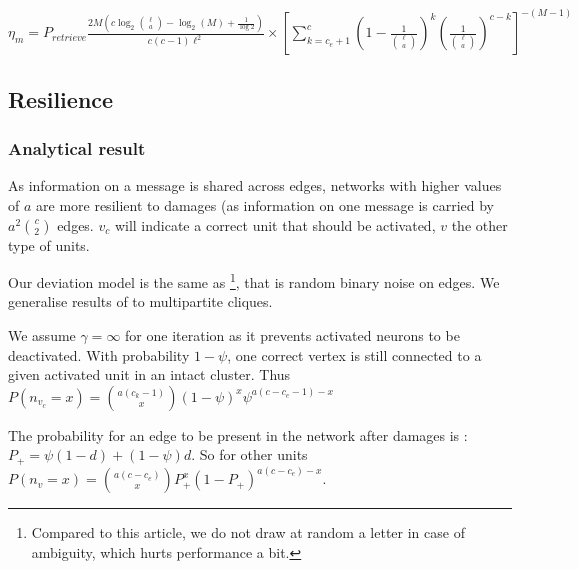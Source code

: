 \documentclass[english,10pt,twocolumn]{IEEEtran}
\renewcommand{\ge}{\geqslant}
\theoremstyle{definition}
\begin{document}
		$\eta_m = P_{retrieve}  \frac{2 M\left(c \log_2{\ell \choose a } - \log_2(M) + \frac{1}{\log 2} \right)}{c(c-1)\ell^2} \times \left [\sum_{k = c_e+1}^{c} \left (1-\frac{1}{{\ell \choose a}} \right )^k \left (\frac{1}{{\ell \choose a}} \right )^{c-k} \right ] ^{-(M-1)}$
		
		

	
	\subsection{Resilience}
	\subsubsection{Analytical result}
	
	As information on a message is shared across edges, networks with higher values of $a$ are more resilient to damages (as information on one message is carried by $a^2 {c \choose 2}$ edges. $v_c$ will indicate a correct unit that should be activated, $v$ the other type of units.
	
	Our deviation model is the same as \cite{LedGriRabGro20145}\footnote{Compared to this article, we do not draw at random a letter in case of ambiguity, which hurts performance a bit.}, that is random binary noise on edges. We generalise results of \cite{LedGriRabGro20145} to multipartite cliques.
	
	We assume $\gamma = \infty$ for one iteration as it prevents activated neurons to be deactivated.
	With probability $1 - \psi$, one correct vertex is still connected to a given activated unit in an intact cluster. Thus $P(n_{v_c} = x ) = {a (c_k-1) \choose x} (1-\psi)^{x} \psi ^ { a (c - c_e -1) - x }$	
	
	
	The probability for an edge to be present in the network after damages is : $P_+ = \psi (1 - d) + (1 - \psi) d$. So for other units $P(n_v = x) = {a (c - c_e) \choose x} P_+^x (1-P_+)^{a (c - c_e) -x }$.
	
%	
	
\end{document}
